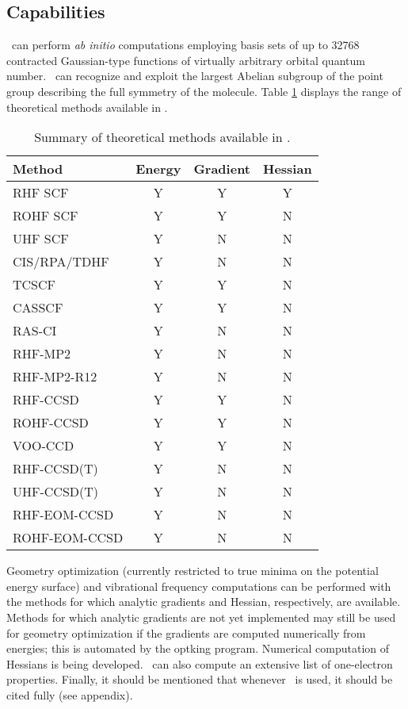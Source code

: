 \subsection{Capabilities}
\PSIthree\ can perform {\em ab initio} computations employing
basis sets of up to 32768 contracted Gaussian-type functions of
virtually arbitrary orbital quantum number.
\PSIthree\ can recognize and exploit the largest Abelian subgroup of the
point group describing the full symmetry of the molecule.
Table \ref{table:methods} displays the range of theoretical
methods available in \PSIthree .
\begin{table}[h]
\caption{Summary of theoretical methods available in \PSIthree.} 
\label{table:methods}
\parsep 10pt
\begin{center}
\begin{tabular}{lccc} \hline\hline
Method      & Energy & Gradient & Hessian \\ \hline
RHF SCF     & Y & Y & Y \\
ROHF SCF    & Y & Y & N \\
UHF SCF     & Y & N & N \\
CIS/RPA/TDHF& Y & N & N \\
TCSCF       & Y & Y & N \\
CASSCF      & Y & Y & N \\
RAS-CI      & Y & N & N \\
RHF-MP2     & Y & N & N \\
RHF-MP2-R12 & Y & N & N \\
RHF-CCSD    & Y & Y & N \\
ROHF-CCSD   & Y & Y & N \\
VOO-CCD     & Y & Y & N \\ 
RHF-CCSD(T) & Y & N & N \\ 
UHF-CCSD(T) & Y & N & N \\ 
RHF-EOM-CCSD& Y & N & N \\ 
ROHF-EOM-CCSD& Y & N & N \\ 
\hline\hline
\end{tabular}
\end{center}
\end{table}
Geometry optimization (currently restricted to true minima on the potential
energy surface) and vibrational frequency computations can be performed
with the methods for which analytic gradients and Hessian, respectively, are
available.  Methods for which analytic gradients are not yet implemented
may still be used for geometry optimization if the gradients are computed
numerically from energies; this is automated by the optking program.
Numerical computation of Hessians is being developed.
\PSIthree\ can also compute an extensive list of one-electron properties.
Finally, it should be mentioned that whenever \PSIthree\ is used,
it should be cited fully (see appendix).

